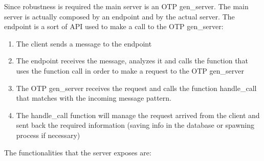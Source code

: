 \noindent Since robustness is required the main server is an OTP gen\_server. The main server is actually composed by an endpoint and by the actual server. The endpoint is a sort of API used to make a call to the OTP gen\_server:
\begin{enumerate}
	\item The client sends a message to the endpoint
	\item The endpoint receives the message, analyzes it and calls the function that uses the function call in order to make a request to the OTP gen\_server
	\item The OTP gen\_server receives the request and calls the function handle\_call that matches with the incoming message pattern.
	\item The handle\_call function will manage the request arrived from the client and sent back the required information (saving info in the database or spawning process if necessary)
\end{enumerate}
\noindent The functionalities that the server exposes are:
